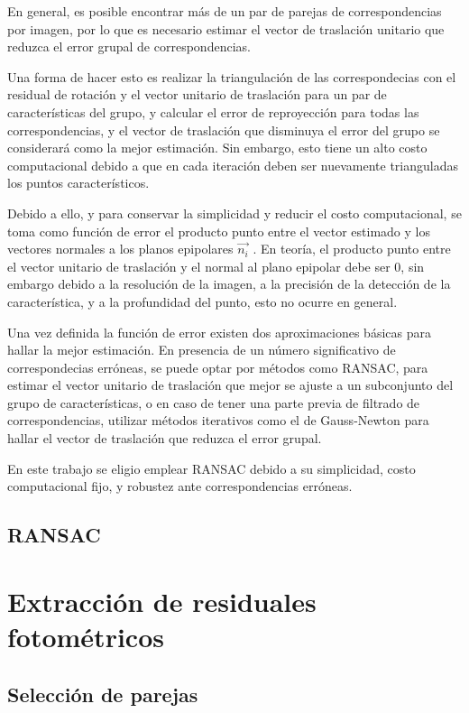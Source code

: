 En general, es posible encontrar más de un par de parejas de correspondencias por imagen, por lo que es necesario estimar el vector de traslación unitario que reduzca el error grupal de correspondencias.

Una forma de hacer esto es realizar la triangulación de las correspondecias con el residual de rotación y  el vector unitario de traslación para un par de características del grupo, y calcular el error de reproyección para todas las correspondencias, y el vector de traslación que disminuya el error del grupo se considerará como la mejor estimación. Sin embargo, esto tiene un alto costo computacional debido a que en cada iteración deben ser nuevamente trianguladas los puntos característicos.

Debido a ello, y para conservar la simplicidad y reducir el costo computacional, se toma como función de error el producto punto entre el vector estimado y los vectores normales a los planos epipolares $\overset { \rightarrow  }{ { n }_{ i } } $ . En teoría, el producto punto entre el vector unitario de traslación y el normal al plano epipolar debe ser $0$, sin embargo debido a la resolución de la imagen, a la precisión de la detección de la característica, y a la profundidad del punto, esto no ocurre en general.

Una vez definida la función de error existen dos aproximaciones básicas para hallar la mejor estimación.
En presencia de un número significativo de correspondecias erróneas, se puede optar por métodos como RANSAC, para estimar el vector unitario de traslación que mejor se ajuste a un subconjunto del grupo de características, o en caso de tener una parte previa de filtrado de correspondencias, utilizar métodos iterativos como el de Gauss-Newton para hallar el vector de traslación que reduzca el error grupal.

En este trabajo se eligio emplear RANSAC debido a su simplicidad, costo computacional fijo, y robustez ante correspondencias erróneas.

\subsection{RANSAC}





\section{Extracción de residuales fotométricos}
\subsection{ Selección de parejas }

